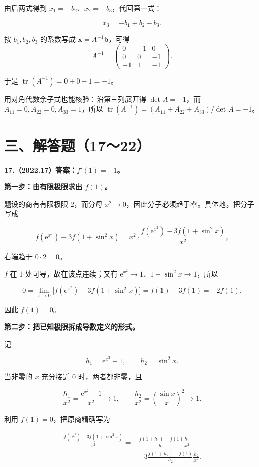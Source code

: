 \documentclass[UTF8,11pt,fontset=windows]{ctexart}
\begin{document}
由后两式得到 $x_1=-b_2$、$x_2=-b_3$，代回第一式：

$$
x_3=-b_1+b_2-b_3.
$$

按 $b_1,b_2,b_3$ 的系数写成 $\boldsymbol x=A^{-1}\boldsymbol b$，可得
$$
A^{-1}=\begin{pmatrix}0&-1&0\\0&0&-1\\-1&1&-1\end{pmatrix}.
$$

于是 $\boxed{\operatorname{tr}(A^{-1})=0+0-1=-1}$。

用对角代数余子式也能核验：沿第三列展开得 $\det A=-1$，而 $A_{11}=0,A_{22}=0,A_{33}=1$，所以 $\operatorname{tr}(A^{-1})=(A_{11}+A_{22}+A_{33})/\det A=-1$。

\clearpage

\section*{三、解答题（17～22）}

\textbf{17.（2022.17）答案：$f'(1)=-1$。}

\textbf{第一步：由有限极限求出 $f(1)$。}

题设的商有有限极限 $2$，而分母 $x^2\to0$，因此分子必须趋于零。具体地，把分子写成

$$
f(\mathrm e^{x^2})-3f(1+\sin^2x)
=x^2\cdot\frac{f(\mathrm e^{x^2})-3f(1+\sin^2x)}{x^2},
$$

右端趋于 $0\cdot2=0$。

$f$ 在 $1$ 处可导，故在该点连续；又有 $\mathrm e^{x^2}\to1$、$1+\sin^2x\to1$，所以

$$
0=\lim_{x\to0}\bigl[f(\mathrm e^{x^2})-3f(1+\sin^2x)\bigr]
=f(1)-3f(1)=-2f(1).
$$

因此 $f(1)=0$。

\textbf{第二步：把已知极限拆成导数定义的形式。}

记

$$
h_1=\mathrm e^{x^2}-1,\qquad h_2=\sin^2x.
$$

当非零的 $x$ 充分接近 $0$ 时，两者都非零，且

$$
\frac{h_1}{x^2}=\frac{\mathrm e^{x^2}-1}{x^2}\longrightarrow1,
\qquad
\frac{h_2}{x^2}=\left(\frac{\sin x}{x}\right)^2\longrightarrow1.
$$

利用 $f(1)=0$，把原商精确写为

$$
\begin{aligned}
\frac{f(\mathrm e^{x^2})-3f(1+\sin^2x)}{x^2}
={}&\frac{f(1+h_1)-f(1)}{h_1}\frac{h_1}{x^2}\\
&-3\frac{f(1+h_2)-f(1)}{h_2}\frac{h_2}{x^2}.
\end{aligned}
$$
\end{document}
